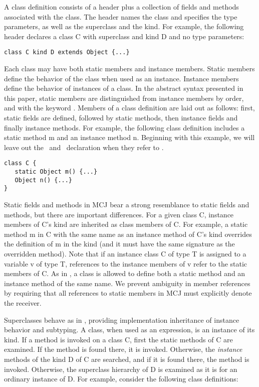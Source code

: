 \documentclass[10pt]{acm-sigplan}
\begin{document}
A class definition consists of a header plus a collection of fields
and methods associated with the class.  The header names the class and
specifies the type parameters, as well as the superclass and the kind.
For example, the following header declares a class {\txt C} with
superclass {} and kind {\txt D} and no type parameters:

\begin{verbatim}
class C kind D extends Object {...}
\end{verbatim}

Each class may have both static members and instance members. Static
members define the behavior of the class when used as an instance.
Instance members define the behavior of instances of a class.  In the
abstract syntax presented in this paper, static members are
distinguished from instance members by order, and with the keyword
\static.  Members of a class definition are laid out as follows:
first, static fields are defined, followed by static methods, then
instance fields and finally instance methods.  For example, the
following class definition includes a static method {\txt m} and an
instance method {\txt n}.  Beginning with this example, we will leave
out the \kind\ and \extends\ declaration when they refer to \Object.

\begin{verbatim}
class C {
   static Object m() {...}
   Object n() {...}
}
\end{verbatim}

Static fields and methods in MCJ bear a strong resemblance to static
fields and methods, but there are important differences. For a given
class {\txt C}, instance members of {\txt C}'s kind are inherited as
class members of {\txt C}. For example, a static method {\txt m} in
{\txt C} with the same name as an instance method of {\txt C}'s kind
overrides the definition of {\txt m} in the kind (and it must have the
same signature as the overridden method). Note that if an instance
class {\txt C} of type {\txt T} is assigned to a variable {\txt v} of
type {\txt T}, references to the instance members of {\txt v} refer to
the static members of {\txt C}.  As in \cite{DimUnits}, a class is
allowed to define both a static method and an instance method of the
same name. We prevent ambiguity in member references by requiring that
all references to static members in MCJ must explicitly denote the
receiver.

Superclasses behave as in \FGJ, providing implementation inheritance
of instance behavior and subtyping. A class, when used as an
expression, is an instance of its kind.  If a method is invoked on a
class {\txt C}, first the static methods of {\txt C} are examined.  If
the method is found there, it is invoked. Otherwise, the
\emph{instance} methods of the kind {\txt D} of {\txt C} are searched,
and if it is found there, the method is invoked.  Otherwise, the
superclass hierarchy of {\txt D} is examined as it is for an ordinary
instance of {\txt D}.
\newpage
For example, consider the following class definitions:
\end{document}
